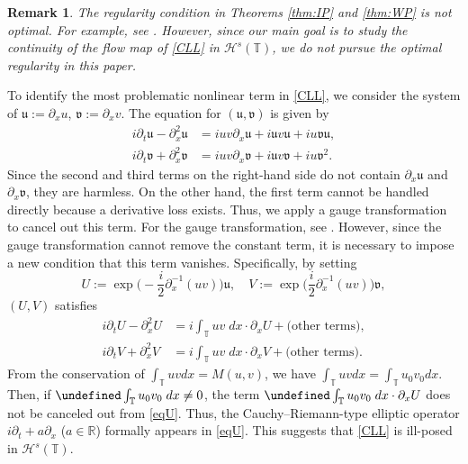 \documentclass[%
11pt,  reqno]{amsart}
\newtheorem{remark}[theorem]{Remark}
\newcommand{\R}{\mathbb{R}}
\newcommand{\T}{\mathbb{T}}
\renewcommand{\H}{\mathcal H}
\newcommand{\uu}{\mathfrak u}
\newcommand{\fv}{\mathfrak v}
\newcommand{\dx}{\partial_x}
\newcommand{\dt}{\partial_t}
\numberwithin{equation}{section}
\numberwithin{theorem}{section}
\let\Im=\undefined\DeclareMathOperator*{\Im}{Im}
\begin{document}
\begin{remark}
\rm
The regularity condition in Theorems \ref{thm:IP} and \ref{thm:WP} is not optimal.
For example, see \cite{He06}. 
However, 
since our main goal is to study the continuity of the flow map of \eqref{CLL} in $\H^s(\T)$,
we do not pursue the optimal regularity in this paper.
\end{remark}



To identify the most problematic nonlinear term in \eqref{CLL}, 
we consider the system of $\uu := \dx u$, $\fv := \dx v$. 
The equation for $(\uu, \fv)$ is given by
\[
\begin{aligned}
i \dt \uu - \dx^2 \uu &= i u v \dx \uu + i \uu v \uu + i u \fv \uu,
\\
i \dt \fv + \dx^2 \fv &= i u v \dx \fv + i \uu v \fv + i u \fv^2.  
\end{aligned}
\]  
Since the second and third terms on the right-hand side do not contain $\dx \uu$ and $\dx \fv$, 
they are harmless. 
On the other hand, 
the first term cannot be handled directly because a derivative loss exists.
Thus, we apply a gauge transformation to cancel out this term.
For the gauge transformation, see \cite{HaOz92, He06}.
However, since the gauge transformation cannot remove the constant term, 
it is necessary to impose a new condition that this term vanishes.
Specifically, by setting 
\[
U:= \exp \Big( - \frac i2 \dx^{-1} (uv) \Big) \uu, 
\quad 
V:= \exp \Big( \frac i2 \dx^{-1} (uv) \Big) \fv, 
\]
$(U, V)$ satisfies 
\begin{equation}
\begin{aligned}
i \dt U - \dx^2 U &= i \int_\T u v\; dx \cdot \dx U + \text{(other terms)},
\\
i \dt V + \dx^2 V &= i \int_\T u v \; dx \cdot \dx V + \text{(other terms)}.
\end{aligned}
\label{eqU}
\end{equation}
From the conservation of $\int_\T u v dx = M(u,v)$,
we have $\int_\T u v dx = \int_\T u_0 v_0 dx$.
Then,
if $\Im \int_\T u_0 v_0 \; dx \neq 0$,
the term $\Im \int_\T u_0 v_0 \; dx \cdot \dx U$ does not be canceled out from \eqref{eqU}.
Thus, 
the Cauchy–Riemann-type elliptic operator
$i \dt + a \dx$ ($a \in \R$) formally appears in \eqref{eqU}.
This suggests that \eqref{CLL} is ill-posed in $\H^s(\T)$.
\end{document}

